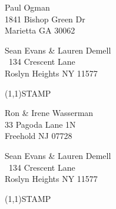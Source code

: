 \documentclass[12pt]{article}
\begin{document}
\begin{center} \begin{Huge} \vspace*{\fill}
Paul Ogman\\
1841 Bishop Green Dr\\
Marietta GA 30062\\
\vspace{\fill} \end{Huge} \end{center}

\clearpage

\begin{minipage}{.5\linewidth} \noindent
Sean Evans \& Lauren Demell\\\ 
134 Crescent Lane\\ 
Roslyn Heights NY 11577
\end{minipage}
\begin{minipage}{.5\linewidth \hspace{-.2in} \vspace{-.3in}}
\begin{flushright}
\framebox(1,1){STAMP}
\end{flushright}
\end{minipage}

\begin{center} \begin{Huge} \vspace*{\fill}
Ron \& Irene Wasserman\\
33 Pagoda Lane 1N\\
Freehold NJ 07728\\
\vspace{\fill} \end{Huge} \end{center}

\clearpage

\begin{minipage}{.5\linewidth} \noindent
Sean Evans \& Lauren Demell\\\ 
134 Crescent Lane\\ 
Roslyn Heights NY 11577
\end{minipage}
\begin{minipage}{.5\linewidth \hspace{-.2in} \vspace{-.3in}}
\begin{flushright}
\framebox(1,1){STAMP}
\end{flushright}
\end{minipage}
\end{document}
